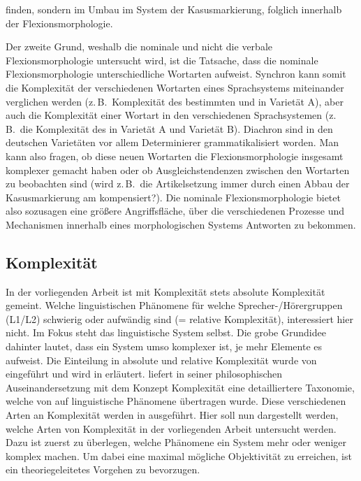 finden, sondern im Umbau im System der Kasusmarkierung, folglich innerhalb der Flexionsmorphologie.\largerpage[-2]\pagebreak

Der zweite Grund, weshalb die nominale und nicht die verbale Flexionsmorphologie untersucht wird, ist die Tatsache, dass die nominale Flexionsmorphologie unterschiedliche Wortarten aufweist. Synchron kann somit die Komplexität der verschiedenen Wortarten eines Sprachsystems miteinander verglichen werden (z.\,B.\ Komplexität des bestimmten und  in Varietät A), aber auch die Komplexität einer Wortart in den verschiedenen Sprachsystemen (z.\,B.\ die Komplexität des  in Varietät A und Varietät B). Diachron sind in den deutschen Varietäten vor allem Determinierer grammatikalisiert worden. Man kann also fragen, ob diese neuen Wortarten die Flexionsmorphologie insgesamt komplexer gemacht haben oder ob Ausgleichstendenzen zwischen den Wortarten zu beobachten sind (wird z.\,B.\ die Artikelsetzung immer durch einen Abbau der Kasusmarkierung am  kompensiert?). Die nominale Flexionsmorphologie bietet also sozusagen eine größere Angriffsfläche, über die verschiedenen Prozesse und Mechanismen innerhalb eines morphologischen Systems Antworten zu bekommen.

\subsection{Komplexität}\label{3.1.2}

In der vorliegenden Arbeit ist mit Komplexität stets absolute Komplexität gemeint. Welche linguistischen Phänomene für welche Sprecher-/Hörergruppen (L1/L2) schwierig oder aufwändig sind (= relative Komplexität), interessiert hier nicht. Im Fokus steht das linguistische System selbst. Die grobe Grundidee dahinter lautet, dass ein System umso komplexer ist, je mehr Elemente es aufweist. Die Einteilung in absolute und relative Komplexität wurde von \citet{Miestamo2008} eingeführt und wird in  erläutert. \citet{Rescher1998} liefert in seiner philosophischen Auseinandersetzung mit dem Konzept Komplexität eine detailliertere Taxonomie, welche von \citet{MiestamoSinnemäkiKarlsson2008} auf linguistische Phänomene übertragen wurde. Diese verschiedenen Arten an Komplexität werden in  ausgeführt. Hier soll nun dargestellt werden, welche Arten von Komplexität in der vorliegenden Arbeit untersucht werden. Dazu ist zuerst zu überlegen, welche Phänomene ein System mehr oder weniger komplex machen. Um dabei eine maximal mögliche Objektivität zu erreichen, ist ein theoriegeleitetes Vorgehen zu bevorzugen.

